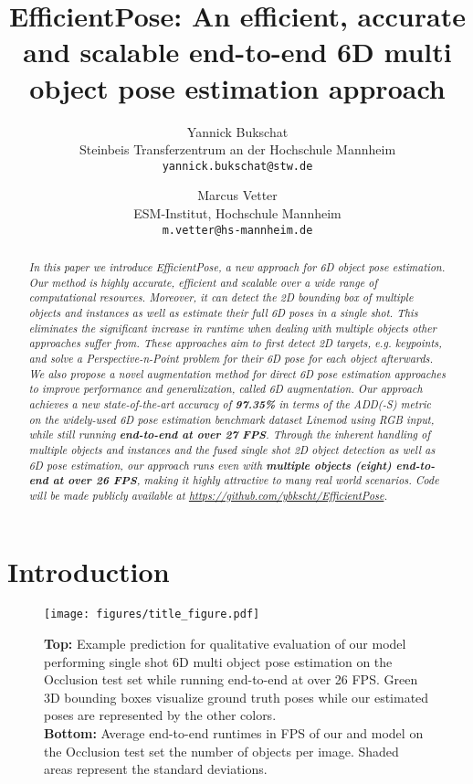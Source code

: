 \documentclass[twocolumn, 10pt, letterpaper]{article}
\title{\bf EfficientPose: An efficient, accurate and scalable end-to-end 6D multi object pose estimation approach}
\author{Yannick Bukschat\\
				\small{Steinbeis Transferzentrum an der Hochschule Mannheim}\\
				\texttt{\small yannick.bukschat@stw.de}
				\and
				Marcus Vetter\\
				\small{ESM-Institut, Hochschule Mannheim}\\
				\texttt{\small m.vetter@hs-mannheim.de}
}
\begin{document}
\maketitle

\begin{abstract}
\textit{In this paper we introduce EfficientPose, a new approach for 6D object pose estimation. Our method is highly accurate, efficient and scalable over a wide range of computational resources. Moreover, it can detect the 2D bounding box of multiple objects and instances as well as estimate their full 6D poses in a single shot. This eliminates the significant increase in runtime when dealing with multiple objects other approaches suffer from. These approaches aim to first detect 2D targets, e.g. keypoints, and solve a Perspective-n-Point problem for their 6D pose for each object afterwards. We also propose a novel augmentation method for direct 6D pose estimation approaches to improve performance and generalization, called 6D augmentation. Our approach achieves a new state-of-the-art accuracy of \textbf{97.35\%} in terms of the ADD(-S) metric on the widely-used 6D pose estimation benchmark dataset Linemod using RGB input, while still running \textbf{end-to-end at over 27 FPS}. Through the inherent handling of multiple objects and instances and the fused single shot 2D object detection as well as 6D pose estimation, our approach runs even with \textbf{multiple objects (eight) end-to-end at over 26 FPS}, making it highly attractive to many real world scenarios. Code will be made publicly available at {\small \url{https://github.com/ybkscht/EfficientPose}}.}
\end{abstract}

\section{Introduction}
\label{section_introduction}

\begin{figure}
\centering
\texttt{[image: figures/title\_figure.pdf]}
\caption{\textbf{Top:} Example prediction for qualitative evaluation of our  model performing single shot 6D multi object pose estimation on the Occlusion test set while running end-to-end at over 26 FPS. Green 3D bounding boxes visualize ground truth poses while our estimated poses are represented by the other colors.\\
\textbf{Bottom:} Average end-to-end runtimes in FPS of our  and  model on the Occlusion test set \wrt the number of objects per image. Shaded areas represent the standard deviations.}
\label{figure_title}
\end{figure}
\end{document}
